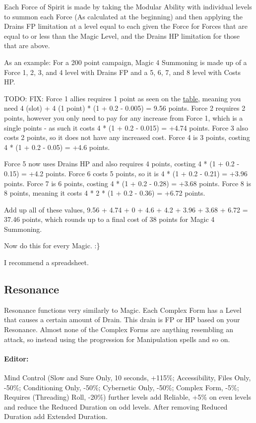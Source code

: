 \begin{multicols*}{2}
	Each Force of Spirit is made by taking the Modular Ability with individual levels to summon each Force (As calculated at the beginning) and then applying the Drains FP limitation at a level equal to each given the Force for Forces that are equal to or less than the Magic Level, and the Drains HP limitation for those that are above. 
	
	As an example: For a 200 point campaign, Magic 4 Summoning is made up of a Force 1, 2, 3, and 4 level with Drains FP and a 5, 6, 7, and 8 level with Costs HP. 
	
	
	
	TODO: FIX: Force 1 allies requires 1 point as seen on the \hyperref[spirit_ally_cost]{table}, meaning you need 4 (slot) + 4 (1 point) * (1 + 0.2 - 0.005) = 9.56 points. Force 2 requires 2 points, however you only need to pay for any increase from Force 1, which is a single points - as such it costs 4 * (1 + 0.2 - 0.015) = +4.74 points. Force 3 also costs 2 points, so it does not have any increased cost. Force 4 is 3 points, costing 4 * (1 + 0.2 - 0.05) = +4.6 points. 
	
	Force 5 now uses Drains HP and also requires 4 points, costing 4 * (1 + 0.2 - 0.15) = +4.2 points. Force 6 costs 5 points, so it is 4 * (1 + 0.2 - 0.21) = +3.96 points. Force 7 is 6 points, costing 4 * (1 + 0.2 - 0.28) = +3.68 points. Force 8 is 8 points, meaning it costs 4 * 2 * (1 + 0.2 - 0.36) = +6.72 points.
	
	Add up all of these values, 9.56 + 4.74 + 0 + 4.6 + 4.2 + 3.96 + 3.68 + 6.72 = 37.46 points, which rounds up to a final cost of 38 points for Magic 4 Summoning.
	
	Now do this for every Magic. :\}
	
	I recommend a spreadsheet.
	
	\subsection{Resonance}
	
	Resonance functions very similarly to Magic. Each Complex Form has a Level that causes a certain amount of Drain. This drain is FP or HP based on your Resonance. Almost none of the Complex Forms are anything resembling an attack, so instead using the progression for Manipulation spells and so on.
	
	\paragraph{Editor:} Mind Control (Slow and Sure Only, 10 seconds, +115\%; Accessibility, Files Only, -50\%; Conditioning Only, -50\%; Cybernetic Only, -50\%; Complex Form, -5\%; Requires (Threading) Roll, -20\%) further levels add Reliable, +5\% on even levels and reduce the Reduced Duration on odd levels. After removing Reduced Duration add Extended Duration.
	

\end{multicols*}
